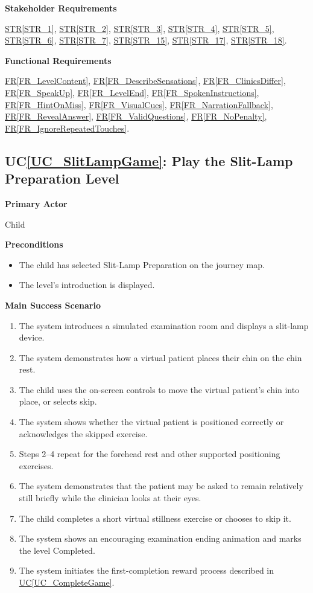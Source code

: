 \documentclass[10pt]{article}
\newcommand{\strref}[1]{\hyperref[#1]{STR\ref*{#1}}}
\newcounter{ucnum} %
\newcommand{\ucref}[1]{\hyperref[#1]{UC\ref*{#1}}}
\newcommand{\ucheading}[1]{UC\ref*{#1}}
\newcommand{\rref}[1]{\hyperref[#1]{FR\ref*{#1}}}
\begin{document}
\textbf{Stakeholder Requirements}

\strref{STR_1}, \strref{STR_2}, \strref{STR_3}, \strref{STR_4}, \strref{STR_5}, \strref{STR_6}, \strref{STR_7}, \strref{STR_15}, \strref{STR_17}, \strref{STR_18}.

\textbf{Functional Requirements}

\rref{FR_LevelContent}, \rref{FR_DescribeSensations}, \rref{FR_ClinicsDiffer}, \rref{FR_SpeakUp}, \rref{FR_LevelEnd}, \rref{FR_SpokenInstructions}, \rref{FR_HintOnMiss}, \rref{FR_VisualCues}, \rref{FR_NarrationFallback}, \rref{FR_RevealAnswer}, \rref{FR_ValidQuestions}, \rref{FR_NoPenalty}, \rref{FR_IgnoreRepeatedTouches}.

\label{UC_SlitLampGame}
\subsection{\ucheading{UC_SlitLampGame}: Play the Slit-Lamp Preparation Level}

\textbf{Primary Actor}

Child

\textbf{Preconditions}
\begin{itemize}
    \item The child has selected Slit-Lamp Preparation on the journey map.
    \item The level's introduction is displayed.
\end{itemize}

\textbf{Main Success Scenario}
\begin{enumerate}
    \item The system introduces a simulated examination room and
    displays a slit-lamp device.
    \item The system demonstrates how a virtual patient places
    their chin on the chin rest.
    \item The child uses the on-screen controls to move the
    virtual patient's chin into place, or selects skip.
    \item The system shows whether the virtual patient is positioned
    correctly or acknowledges the skipped exercise.
    \item Steps 2--4 repeat for the forehead rest and other
    supported positioning exercises.
    \item The system demonstrates that the patient may be asked
    to remain relatively still briefly while the clinician looks
    at their eyes.
    \item The child completes a short virtual stillness exercise
    or chooses to skip it.
    \item The system shows an encouraging examination ending
    animation and marks the level Completed.
    \item The system initiates the first-completion reward process
    described in \ucref{UC_CompleteGame}.
\end{enumerate}
\end{document}
